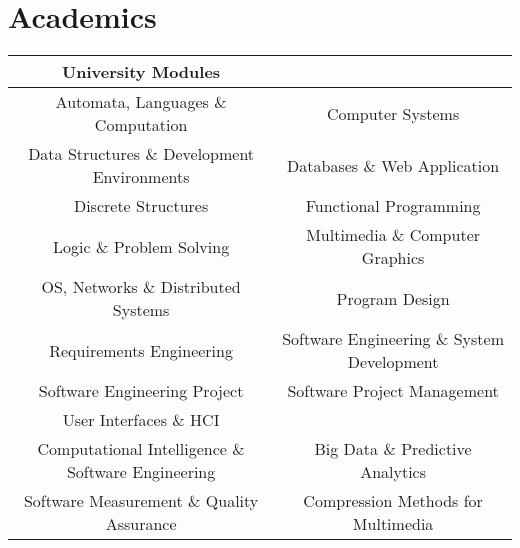 \documentclass[letterpaper,11pt]{article}
\begin{document}
\section{Academics}
\begin{center}
\begin{tabular}{ c c } 
 University Modules\\
 \hline
 Automata, Languages \& Computation & Computer Systems\\ 
 Data Structures \& Development Environments & Databases \& Web Application\\
 Discrete Structures & Functional Programming\\
 Logic \& Problem Solving & Multimedia \& Computer Graphics\\
 OS, Networks \& Distributed Systems  & Program Design\\
 Requirements Engineering & Software Engineering \& System Development\\
 Software Engineering Project & Software Project Management\\
 User Interfaces \& HCI & \\
 Computational Intelligence \& Software Engineering & Big Data \& Predictive Analytics \\
 Software Measurement \& Quality Assurance & Compression Methods for Multimedia \\
 \hline
\end{tabular}
\end{center}



\end{document}
